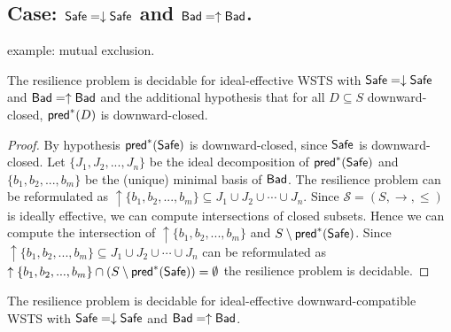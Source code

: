 



\subsection{Case: $\textsf{Safe}=\downarrow \textsf{Safe}$ and $\textsf{Bad}=\uparrow \textsf{Bad}$.}
%
%
example: mutual exclusion.

\begin{theorem}
The resilience problem is decidable for ideal-effective WSTS with 
$\textsf{Safe}=\downarrow \textsf{Safe}$
and $\textsf{Bad}=\uparrow \textsf{Bad}$
and
the additional hypothesis that
for all $D \subseteq S$ downward-closed, $\textsf{pred}^*(D)$ is downward-closed.
\end{theorem}

\begin{proof}
By hypothesis $\textsf{pred}^*(\textsf{Safe})$ is downward-closed, since $\textsf{Safe}$ is downward-closed.
 Let $\{J_1, J_2,...,J_n\}$ be the ideal decomposition of $\textsf{pred}^*(\textsf{Safe})$ and $\{b_1,b_2,...,b_m\}$ be the (unique) minimal basis of $\textsf{Bad}$.
The resilience problem can be reformulated as 
 $\uparrow \{b_1,b_2,...,b_m\} \subseteq J_1 \cup J_2 \cup \cdots \cup J_n$.
Since $\mathscr{S}=(S,\rightarrow, \leq)$ is ideally effective, we can compute intersections of closed subsets.
Hence we can compute the intersection of
$\uparrow \{b_1,b_2,...,b_m\}$
and
$S \setminus \textsf{pred}^*(\textsf{Safe})$.
Since
$\uparrow \{b_1,b_2,...,b_m\} \subseteq J_1 \cup J_2 \cup \cdots \cup J_n$
can be reformulated as
$\uparrow \{b_1,b_2,...,b_m\} \cap (S \setminus \textsf{pred}^*(\textsf{Safe})) = \emptyset$
the resilience problem is decidable.
\end{proof}

\begin{corollary}
The resilience problem is decidable for ideal-effective downward-compatible WSTS with 
$\textsf{Safe}=\downarrow \textsf{Safe}$
and $\textsf{Bad}=\uparrow \textsf{Bad}$.
\end{corollary}

